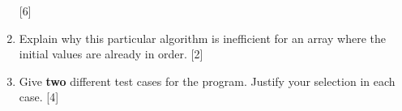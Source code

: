 \begin{enumerate}
\hfill{}{[}6{]}
\item Explain why this particular algorithm is inefficient for an array
where the initial values are already in order.\hfill{} {[}2{]}
\item Give \textbf{two} different test cases for the program. Justify your
selection in each case.\hfill{} {[}4{]}
\end{enumerate}